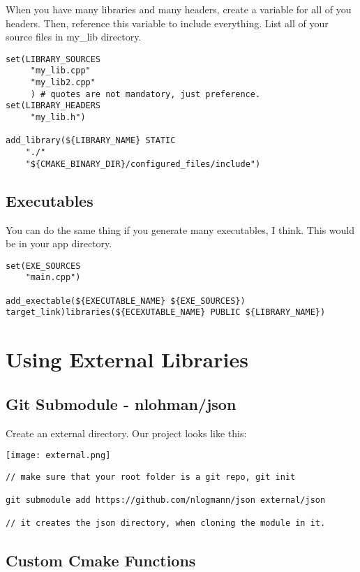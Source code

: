 \documentclass[openany]{report}
\begin{document}
When you have many libraries and many headers, create a variable for all of you headers. Then, reference this variable to include
everything. List all of your source files in my\_lib directory.

\begin{verbatim}
set(LIBRARY_SOURCES
     "my_lib.cpp"
     "my_lib2.cpp"
     ) # quotes are not mandatory, just preference.
set(LIBRARY_HEADERS
     "my_lib.h")

add_library(${LIBRARY_NAME} STATIC
    "./"
    "${CMAKE_BINARY_DIR}/configured_files/include")
\end{verbatim}

\subsection{Executables}

You can do the same thing if you generate many executables, I think. This would be in your app directory.

\begin{verbatim}
set(EXE_SOURCES
    "main.cpp")

add_exectable(${EXECUTABLE_NAME} ${EXE_SOURCES})
target_link)libraries(${ECEXUTABLE_NAME} PUBLIC ${LIBRARY_NAME})
\end{verbatim}


\section{Using External Libraries}


\subsection{Git Submodule - nlohman/json}

Create an external directory. Our project looks like this:

\begin{center}
    \texttt{[image: external.png]}
\end{center}

\begin{verbatim}
// make sure that your root folder is a git repo, git init

git submodule add https://github.com/nlogmann/json external/json

// it creates the json directory, when cloning the module in it.
\end{verbatim}

\subsection{Custom Cmake Functions}
\end{document}
